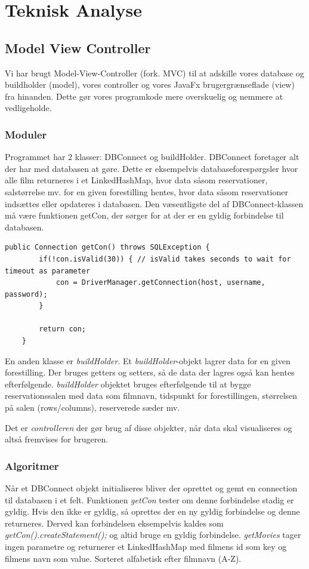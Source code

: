 \documentclass[final]{report}
\begin{document}
\chapter{Teknisk Analyse}
\section{Model View Controller}
Vi har brugt Model-View-Controller (fork. MVC) til at adskille vores database og buildholder (model), vores controller og vores JavaFx brugergrænseflade (view) fra hinanden. Dette gør vores programkode mere overskuelig og nemmere at vedligeholde.

\subsection{Moduler}
Programmet har 2 klasser: DBConnect og buildHolder.
DBConnect foretager alt der har med databasen at gøre. Dette er eksempelvis databaseforespørgsler hvor alle film returneres i et LinkedHashMap, hvor data såsom reservationer, salstørrelse mv. for en given forestilling hentes, hvor data såsom reservationer indsættes eller opdateres i databasen. Den væsentligste del af DBConnect-klassen må være funktionen getCon, der sørger for at der er en gyldig forbindelse til databasen. 

\begin{verbatim}
public Connection getCon() throws SQLException {
        if(!con.isValid(30)) { // isValid takes seconds to wait for timeout as parameter
            con = DriverManager.getConnection(host, username, password);
        }

        return con;
    }
\end{verbatim}

En anden klasse er \emph{buildHolder}. Et \emph{buildHolder}-objekt lagrer data for en given forestilling. Der bruges getters og setters, så de data der lagres også kan hentes efterfølgende. \emph{buildHolder} objektet bruges efterfølgende til at bygge reservationssalen med data som filmnavn, tidspunkt for forestillingen, størrelsen på salen (rows/columns), reserverede sæder mv. 

Det er \emph{controlleren} der gør brug af disse objekter, når data skal visualiseres og altså fremvises for brugeren.

\subsection{Algoritmer}
Når et DBConnect objekt initialiseres bliver der oprettet og gemt en connection til databasen i et felt. Funktionen \emph{getCon} tester om denne forbindelse stadig er gyldig. Hvis den ikke er gyldig, så oprettes der en ny gyldig forbindelse og denne returneres. Derved kan forbindelsen eksempelvis kaldes som \emph{getCon().createStatement();} og altid bruge en gyldig forbindelse. \emph{getMovies} tager ingen parametre og returnerer et LinkedHashMap med filmens id som key og filmens navn som value. Sorteret alfabetisk efter filmnavn (A-Z).
\end{document}
